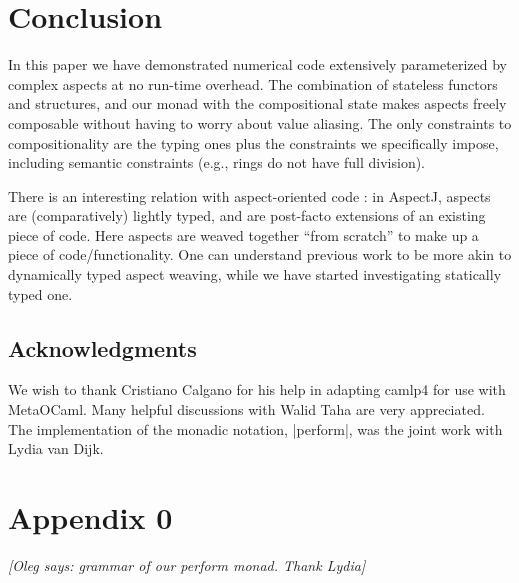 \documentclass[draft]{elsart}
\newcommand{\oleg}[1]{{\it [Oleg says: #1]}}
\begin{document}
\section{Conclusion}\label{conclusion}
In this paper we have demonstrated numerical code extensively parameterized
by complex aspects at no run-time overhead.  The combination of
stateless functors and structures, and our monad with the
compositional state makes aspects freely composable without having to
worry about value aliasing. The only constraints to compositionality
are the typing ones plus the constraints we specifically
impose, including semantic constraints (e.g., rings do not have full
division).

There is an interesting relation with aspect-oriented code
\cite{kiczales97aspectoriented}: in AspectJ, 
aspects are (comparatively) lightly typed, and are post-facto extensions of an
existing piece of code.  Here aspects are weaved together ``from scratch'' to
make up a piece of code/functionality.  One can understand previous work to be
more akin to dynamically typed aspect weaving, while we have started
investigating statically typed one.

\subsection*{Acknowledgments}
We wish to thank Cristiano Calgano for his help in adapting camlp4 for
use with MetaOCaml. Many helpful discussions with Walid Taha are very
appreciated. The implementation of the monadic notation, |perform|,
was the joint work with Lydia van Dijk.



\section{Appendix 0}
\label{app:perform}
\oleg{grammar of our perform monad. Thank Lydia}
\end{document}
